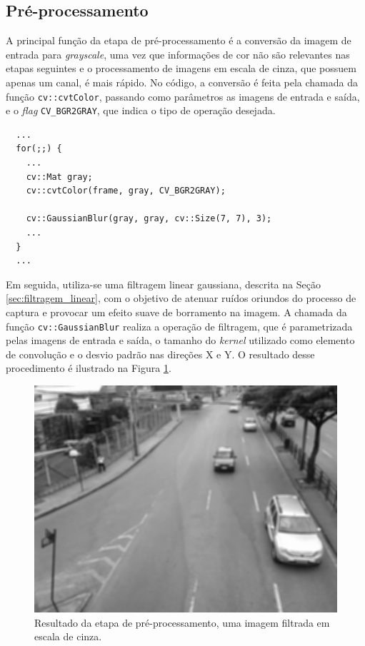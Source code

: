 
\subsection{Pré-processamento} %
\label{sub:pr_processamento}

A principal função da etapa de pré-processamento é a conversão da imagem de entrada para \textit{grayscale}, uma vez que informações de cor não são relevantes nas etapas seguintes e o processamento de imagens em escala de cinza, que possuem apenas um canal, é mais rápido. No código, a conversão é feita pela chamada da função \verb!cv::cvtColor!, passando como parâmetros as imagens de entrada e saída, e o \textit{flag} \verb!CV_BGR2GRAY!, que indica o tipo de operação desejada.

\begin{lstlisting}
  ...
  for(;;) {
    ...
    cv::Mat gray;
    cv::cvtColor(frame, gray, CV_BGR2GRAY);

    cv::GaussianBlur(gray, gray, cv::Size(7, 7), 3);
    ...
  }
  ...  
\end{lstlisting}

Em seguida, utiliza-se uma filtragem linear gaussiana, descrita na Seção \ref{sec:filtragem_linear}, com o objetivo de atenuar ruídos oriundos do processo de captura e provocar um efeito suave de borramento na imagem. A chamada da função \verb!cv::GaussianBlur! realiza a operação de filtragem, que é parametrizada pelas imagens de entrada e saída, o tamanho do \textit{kernel} utilizado como elemento de convolução e o desvio padrão nas direções X e Y. O resultado desse procedimento é ilustrado na Figura \ref{fig:pre_processamento}.

\begin{figure}[ht]
  \begin{center}
    \includegraphics[scale=0.5]{imgs/gray.png}
  \end{center}
  \caption{Resultado da etapa de pré-processamento, uma imagem filtrada em escala de cinza.}
  \label{fig:pre_processamento}
\end{figure}

